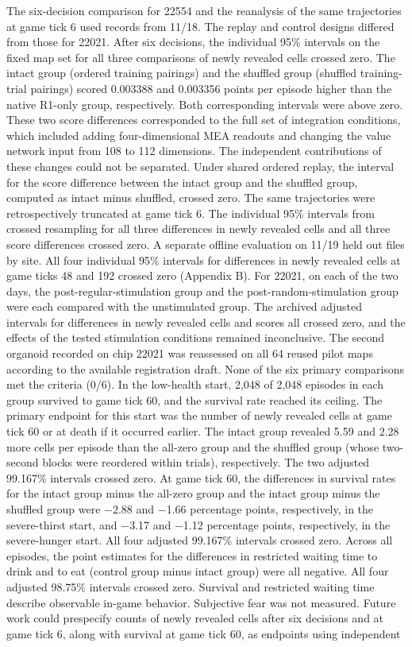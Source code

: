 \documentclass{article}
\begin{document}
The six-decision comparison for 22554 and the reanalysis of the same trajectories at game tick 6 used records from 11/18. The replay and control designs differed from those for 22021. After six decisions, the individual 95\% intervals on the fixed map set for all three comparisons of newly revealed cells crossed zero. The intact group (ordered training pairings) and the shuffled group (shuffled training-trial pairings) scored 0.003388 and 0.003356 points per episode higher than the native R1-only group, respectively. Both corresponding intervals were above zero. These two score differences corresponded to the full set of integration conditions, which included adding four-dimensional MEA readouts and changing the value network input from 108 to 112 dimensions. The independent contributions of these changes could not be separated. Under shared ordered replay, the interval for the score difference between the intact group and the shuffled group, computed as intact minus shuffled, crossed zero. The same trajectories were retrospectively truncated at game tick 6. The individual 95\% intervals from crossed resampling for all three differences in newly revealed cells and all three score differences crossed zero. A separate offline evaluation on 11/19 held out files by site. All four individual 95\% intervals for differences in newly revealed cells at game ticks 48 and 192 crossed zero (Appendix B). For 22021, on each of the two days, the post-regular-stimulation group and the post-random-stimulation group were each compared with the unstimulated group. The archived adjusted intervals for differences in newly revealed cells and scores all crossed zero, and the effects of the tested stimulation conditions remained inconclusive. The second organoid recorded on chip 22021 was reassessed on all 64 reused pilot maps according to the available registration draft. None of the six primary comparisons met the criteria (0/6). In the low-health start, 2,048 of 2,048 episodes in each group survived to game tick 60, and the survival rate reached its ceiling. The primary endpoint for this start was the number of newly revealed cells at game tick 60 or at death if it occurred earlier. The intact group revealed 5.59 and 2.28 more cells per episode than the all-zero group and the shuffled group (whose two-second blocks were reordered within trials), respectively. The two adjusted 99.167\% intervals crossed zero. At game tick 60, the differences in survival rates for the intact group minus the all-zero group and the intact group minus the shuffled group were \ensuremath{-}2.88 and \ensuremath{-}1.66 percentage points, respectively, in the severe-thirst start, and \ensuremath{-}3.17 and \ensuremath{-}1.12 percentage points, respectively, in the severe-hunger start. All four adjusted 99.167\% intervals crossed zero. Across all episodes, the point estimates for the differences in restricted waiting time to drink and to eat (control group minus intact group) were all negative. All four adjusted 98.75\% intervals crossed zero. Survival and restricted waiting time describe observable in-game behavior. Subjective fear was not measured. Future work could prespecify counts of newly revealed cells after six decisions and at game tick 6, along with survival at game tick 60, as endpoints using independent 
\end{document}
